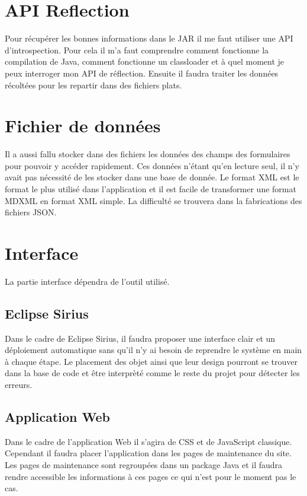 \section{API Reflection}
Pour récupérer les bonnes informations dans le JAR il me faut utiliser une API d'introspection. Pour cela il m'a faut comprendre comment fonctionne la compilation de Java, comment fonctionne un classloader et à quel moment je peux interroger mon API de réflection. Ensuite il faudra traiter les données récoltées pour les repartir dans des fichiers plats.

\section{Fichier de données}
Il a aussi fallu stocker dans des fichiers les données des champs des formulaires pour pouvoir y accéder rapidement. Ces données n'étant qu'en lecture seul, il n'y avait pas nécessité de les stocker dans une base de donnée. Le format XML est le format le plus utilisé dans l'application et il est facile de transformer une format MDXML en format XML simple. La difficulté se trouvera dans la fabrications des fichiers JSON.

\section{Interface}
La partie interface dépendra de l'outil utilisé.

\subsection{Eclipse Sirius}
Dans le cadre de Eclipse Sirius, il faudra proposer une interface clair et un déploiement automatique sans qu'il n'y ai besoin de reprendre le système en main à chaque étape. Le placement des objet ainsi que leur design pourront se trouver dans la base de code et être interprèté comme le reste du projet pour détecter les erreurs. 

\subsection{Application Web}
Dans le cadre de l'application Web il s'agira de CSS et de JavaScript classique. Cependant il faudra placer l'application dans les pages de maintenance du site. Les pages de maintenance sont regroupées dans un package Java et il faudra rendre accessible les informations à ces pages ce qui n'est pour le moment pas le cas.

